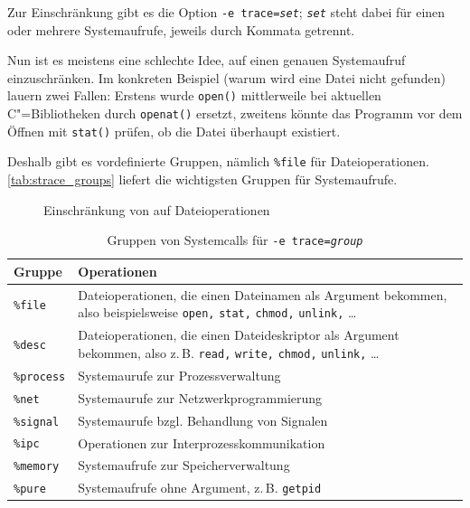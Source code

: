 Zur Einschränkung gibt es die Option \texttt{-e trace=\emph{set}}; \texttt{\emph{set}}
steht dabei für einen oder mehrere Systemaufrufe, jeweils durch Kommata getrennt.

Nun ist es meistens eine schlechte Idee, \strace{} auf einen genauen Systemaufruf einzuschränken.
Im konkreten Beispiel (warum wird eine Datei nicht gefunden) lauern zwei Fallen: Erstens wurde
\texttt{open()} mittlerweile bei aktuellen C"=Bibliotheken durch \texttt{openat()} ersetzt, zweitens
könnte das Programm vor dem Öffnen mit \texttt{stat()} prüfen, ob die Datei überhaupt existiert.

Deshalb gibt es vordefinierte Gruppen, nämlich \texttt{\%file} für Dateioperationen.
\autoref{tab:strace_groups} liefert die wichtigsten Gruppen für Systemaufrufe.


\begin{figure}[tb]
  
  \caption{Einschränkung von \strace{} auf Dateioperationen}
  \label{fig:fileonly}
\end{figure}


\begin{table}[htb]
  \centering\small
  \begin{tabular}{|lp{6cm}|}
    \hline
    \textbf{Gruppe} & \textbf{Operationen} \\
    \hline
    \texttt{\%file}          & Dateioperationen, die einen Dateinamen als Argument
                               bekommen, also beispielsweise \texttt{open,} \texttt{stat,}
                               \texttt{chmod,} \texttt{unlink,} … \\
    \texttt{\%desc}          & Dateioperationen, die einen Dateideskriptor als Argument
                               bekommen, also z.\,B. \texttt{read,} \texttt{write,}
                               \texttt{chmod,} \texttt{unlink,} … \\
    \texttt{\%process}       & Systemaurufe zur Prozessverwaltung \\
    \texttt{\%net}           & Systemaurufe zur Netzwerkprogrammierung \\
    \texttt{\%signal}        & Systemaurufe bzgl. Behandlung von Signalen \\
    \texttt{\%ipc}           & Operationen zur Interprozesskommunikation \\
    \texttt{\%memory}        & Systemaufrufe zur Speicherverwaltung \\
    \texttt{\%pure}          & Systemaufrufe ohne Argument, z.\,B. \texttt{getpid} \\
    \hline
  \end{tabular}
  \caption{Gruppen von Systemcalls für \texttt{-e trace=\emph{group}}}
  \label{tab:strace_groups}
\end{table}

